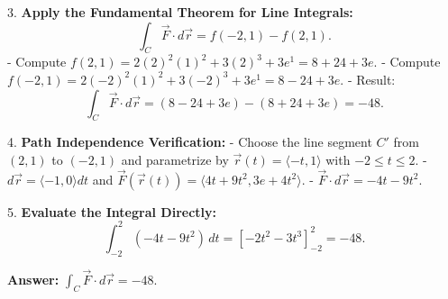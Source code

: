 \documentclass[9pt]{article}
\begin{document}
\begin{multicols}{2}
\begin{tcolorbox}[title=\textbf{Example: Evaluating a Line Integral}, colframe=lightpink]
    3. \textbf{Apply the Fundamental Theorem for Line Integrals:}
       \[ \int_C \vec{F} \cdot d\vec{r} = f(-2, 1) - f(2, 1). \]
       - Compute \( f(2, 1) = 2(2)^2(1)^2 + 3(2)^3 + 3e^1 = 8 + 24 + 3e \).
       - Compute \( f(-2, 1) = 2(-2)^2(1)^2 + 3(-2)^3 + 3e^1 = 8 - 24 + 3e \).
       - Result: \[ \int_C \vec{F} \cdot d\vec{r} = (8 - 24 + 3e) - (8 + 24 + 3e) = -48. \]
    
    4. \textbf{Path Independence Verification:}
       - Choose the line segment \( C' \) from \( (2, 1) \) to \( (-2, 1) \) and parametrize by \( \vec{r}(t) = \langle -t, 1 \rangle \) with \( -2 \leq t \leq 2 \).
       - \( d\vec{r} = \langle -1, 0 \rangle dt \) and \( \vec{F}(\vec{r}(t)) = \langle 4t + 9t^2, 3e + 4t^2 \rangle \).
       - \( \vec{F} \cdot d\vec{r} = -4t - 9t^2 \).
    
    5. \textbf{Evaluate the Integral Directly:}
       \[ \int_{-2}^{2} (-4t - 9t^2) \, dt = \left[ -2t^2 - 3t^3 \right]_{-2}^{2} = -48. \]
    
    \textbf{Answer:} \( \int_C \vec{F} \cdot d\vec{r} = -48 \).
\end{tcolorbox}

\end{multicols}
\end{document}
